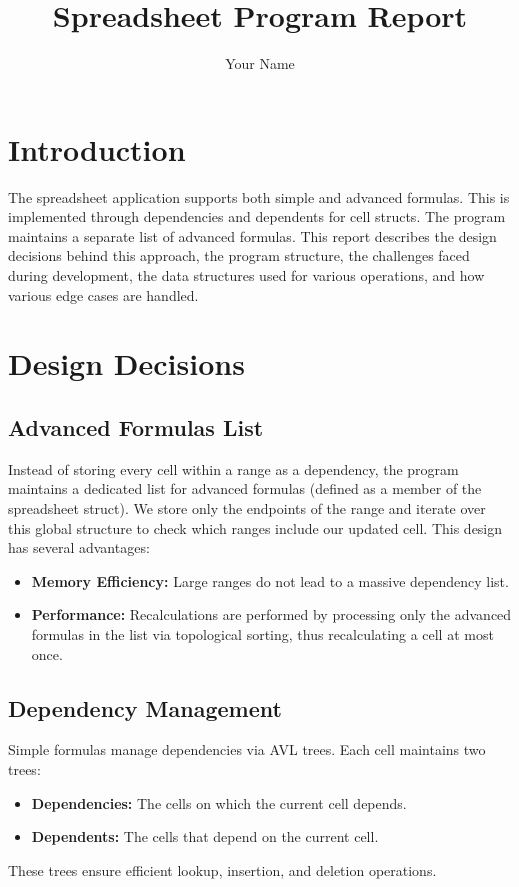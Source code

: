 \documentclass[12pt]{article}
\title{Spreadsheet Program Report}
\author{Your Name}
\begin{document}
\maketitle

\section{Introduction}
The spreadsheet application supports both simple and advanced formulas. This is implemented through dependencies and dependents for cell structs. The program maintains a separate list of advanced formulas. This report describes the design decisions behind this approach, the program structure, the challenges faced during development, the data structures used for various operations, and how various edge cases are handled.

\section{Design Decisions}
\subsection{Advanced Formulas List}
Instead of storing every cell within a range as a dependency, the program maintains a dedicated list for advanced formulas (defined as a member of the spreadsheet struct). We store only the endpoints of the range and iterate over this global structure to check which ranges include our updated cell. This design has several advantages:
\begin{itemize}[noitemsep]
    \item \textbf{Memory Efficiency:} Large ranges do not lead to a massive dependency list.
    \item \textbf{Performance:} Recalculations are performed by processing only the advanced formulas in the list via topological sorting, thus recalculating a cell at most once.
\end{itemize}

\subsection{Dependency Management}
Simple formulas manage dependencies via AVL trees. Each cell maintains two trees:
\begin{itemize}[noitemsep]
    \item \textbf{Dependencies:} The cells on which the current cell depends.
    \item \textbf{Dependents:} The cells that depend on the current cell.
\end{itemize}
These trees ensure efficient lookup, insertion, and deletion operations.
\end{document}
